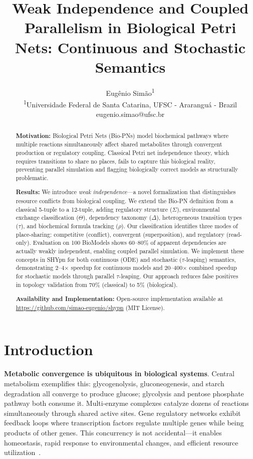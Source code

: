 \documentclass[twocolumn,11pt]{article}
\title{\textbf{Weak Independence and Coupled Parallelism in Biological Petri Nets: Continuous and Stochastic Semantics}}
\author{
Eugênio Simão\textsuperscript{1}\\
\textsuperscript{1}Universidade Federal de Santa Catarina, UFSC - Araranguá - Brazil\\
eugenio.simao@ufsc.br
}
\date{}
\begin{document}
\maketitle

\begin{abstract}
\textbf{Motivation:} Biological Petri Nets (Bio-PNs) model biochemical pathways where multiple reactions simultaneously affect shared metabolites through convergent production or regulatory coupling. Classical Petri net independence theory, which requires transitions to share no places, fails to capture this biological reality, preventing parallel simulation and flagging biologically correct models as structurally problematic.

\textbf{Results:} We introduce \emph{weak independence}---a novel formalization that distinguishes resource conflicts from biological coupling. We extend the Bio-PN definition from a classical 5-tuple to a 12-tuple, adding regulatory structure ($\Sigma$), environmental exchange classification ($\Theta$), dependency taxonomy ($\Delta$), heterogeneous transition types ($\tau$), and biochemical formula tracking ($\rho$). Our classification identifies three modes of place-sharing: competitive (conflict), convergent (superposition), and regulatory (read-only). Evaluation on 100 BioModels shows 60--80\% of apparent dependencies are actually weakly independent, enabling coupled parallel simulation. We implement these concepts in SHYpn for both continuous (ODE) and stochastic ($\tau$-leaping) semantics, demonstrating 2--4$\times$ speedup for continuous models and 20--400$\times$ combined speedup for stochastic models through parallel $\tau$-leaping. Our approach reduces false positives in topology validation from 70\% (classical) to 5\% (biological).

\textbf{Availability and Implementation:} Open-source implementation available at \url{https://github.com/simao-eugenio/shypn} (MIT License).
\end{abstract}

\section{Introduction}

\textbf{Metabolic convergence is ubiquitous in biological systems}. Central metabolism exemplifies this: glycogenolysis, gluconeogenesis, and starch degradation all converge to produce glucose; glycolysis and pentose phosphate pathway both consume it. Multi-enzyme complexes catalyze dozens of reactions simultaneously through shared active sites. Gene regulatory networks exhibit feedback loops where transcription factors regulate multiple genes while being products of other genes. This concurrency is not accidental---it enables homeostasis, rapid response to environmental changes, and efficient resource utilization~\cite{Alberts2015,Nelson2017}.
\end{document}
